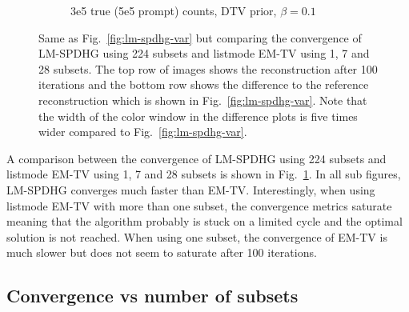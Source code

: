 \begin{figure}
\begin{subfigure}[]{1.0\textwidth}
    \caption{3e5 true (5e5 prompt) counts, DTV prior, $\beta = 0.1$}
  \end{subfigure}
  \caption{Same as Fig.~\ref{fig:lm-spdhg-var} but comparing the convergence of LM-SPDHG using
           224 subsets and listmode EM-TV using 1, 7 and 28 subsets.
           The top row of images shows the reconstruction after 100 iterations and the bottom
           row shows the difference to the reference reconstruction which is shown in
           Fig.~\ref{fig:lm-spdhg-var}.
           Note that the width of the color window in the difference plots is five times wider
           compared to Fig.~\ref{fig:lm-spdhg-var}.}
  \label{fig:emtv}
\end{figure}



A comparison between the convergence of LM-SPDHG using 224 subsets and listmode 
EM-TV using 1, 7 and 28 subsets is shown in Fig.~\ref{fig:emtv}.
In all sub figures, LM-SPDHG converges much faster than EM-TV.
Interestingly, when using listmode EM-TV with more than one subset, the convergence
metrics saturate meaning that the algorithm probably is stuck
on a limited cycle and the optimal solution is not reached.
When using one subset, the convergence of EM-TV is much slower but does not seem
to saturate after 100 iterations.


\subsection*{Convergence vs number of subsets}

